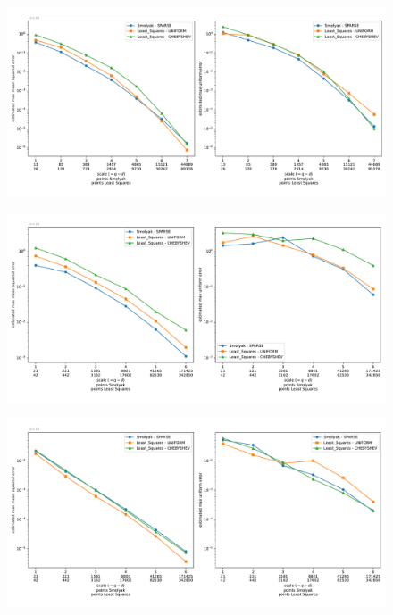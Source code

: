 \documentclass[12pt, oneside]{amsart}
\theoremstyle{definition}
\theoremstyle{remark}
\numberwithin{equation}{section}
\begin{document}

\begin{figure}[h]
	\centering
	\includegraphics[width=\linewidth]{figures/oscillatory/dim6/max_error_distribution_fixed_dim}
	\caption{}
	\label{fig:oscillatory_dim6}
\end{figure}

\begin{figure}[h]
	\centering
	\includegraphics[width=\linewidth]{figures/oscillatory/dim10/max_error_distribution_fixed_dim}
	\caption{}
	\label{fig:oscillatory_dim10}
\end{figure}


\begin{figure}[h]
	\centering
	\includegraphics[width=\linewidth]{figures/product_peak/dim10/max_error_distribution_fixed_dim}
	\caption{}
	\label{fig:product_peak_dim10}
\end{figure}
\end{document}
